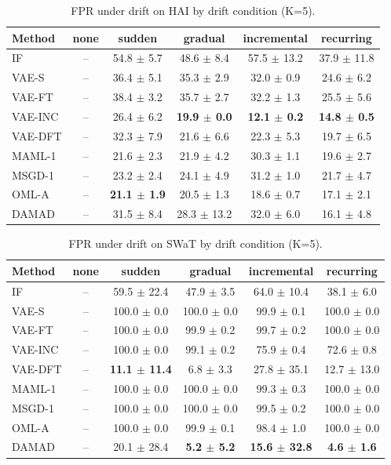 \begin{table}[t]
\centering
\small
\caption{FPR under drift on HAI by drift condition (K=5).}
\label{tab:drift_fpr_drift_hai}
\begin{tabular}{lccccc}
\toprule
Method & none & sudden & gradual & incremental & recurring \\
\midrule
IF & – & 54.8 $\pm$ 5.7 & 48.6 $\pm$ 8.4 & 57.5 $\pm$ 13.2 & 37.9 $\pm$ 11.8 \\
VAE-S & – & 36.4 $\pm$ 5.1 & 35.3 $\pm$ 2.9 & 32.0 $\pm$ 0.9 & 24.6 $\pm$ 6.2 \\
VAE-FT & – & 38.4 $\pm$ 3.2 & 35.7 $\pm$ 2.7 & 32.2 $\pm$ 1.3 & 25.5 $\pm$ 5.6 \\
VAE-INC & – & 26.4 $\pm$ 6.2 & \textbf{19.9 $\pm$ 0.0} & \textbf{12.1 $\pm$ 0.2} & \textbf{14.8 $\pm$ 0.5} \\
VAE-DFT & – & 32.3 $\pm$ 7.9 & 21.6 $\pm$ 6.6 & 22.3 $\pm$ 5.3 & 19.7 $\pm$ 6.5 \\
MAML-1 & – & 21.6 $\pm$ 2.3 & 21.9 $\pm$ 4.2 & 30.3 $\pm$ 1.1 & 19.6 $\pm$ 2.7 \\
MSGD-1 & – & 23.2 $\pm$ 2.4 & 24.1 $\pm$ 4.9 & 31.2 $\pm$ 1.0 & 21.7 $\pm$ 4.7 \\
OML-A & – & \textbf{21.1 $\pm$ 1.9} & 20.5 $\pm$ 1.3 & 18.6 $\pm$ 0.7 & 17.1 $\pm$ 2.1 \\
DAMAD & – & 31.5 $\pm$ 8.4 & 28.3 $\pm$ 13.2 & 32.0 $\pm$ 6.0 & 16.1 $\pm$ 4.8 \\
\bottomrule
\end{tabular}
\end{table}

\begin{table}[t]
\centering
\small
\caption{FPR under drift on SWaT by drift condition (K=5).}
\label{tab:drift_fpr_drift_swat}
\begin{tabular}{lccccc}
\toprule
Method & none & sudden & gradual & incremental & recurring \\
\midrule
IF & – & 59.5 $\pm$ 22.4 & 47.9 $\pm$ 3.5 & 64.0 $\pm$ 10.4 & 38.1 $\pm$ 6.0 \\
VAE-S & – & 100.0 $\pm$ 0.0 & 100.0 $\pm$ 0.0 & 99.9 $\pm$ 0.1 & 100.0 $\pm$ 0.0 \\
VAE-FT & – & 100.0 $\pm$ 0.0 & 99.9 $\pm$ 0.2 & 99.7 $\pm$ 0.2 & 100.0 $\pm$ 0.0 \\
VAE-INC & – & 100.0 $\pm$ 0.0 & 99.1 $\pm$ 0.2 & 75.9 $\pm$ 0.4 & 72.6 $\pm$ 0.8 \\
VAE-DFT & – & \textbf{11.1 $\pm$ 11.4} & 6.8 $\pm$ 3.3 & 27.8 $\pm$ 35.1 & 12.7 $\pm$ 13.0 \\
MAML-1 & – & 100.0 $\pm$ 0.0 & 100.0 $\pm$ 0.0 & 99.3 $\pm$ 0.3 & 100.0 $\pm$ 0.0 \\
MSGD-1 & – & 100.0 $\pm$ 0.0 & 100.0 $\pm$ 0.0 & 99.5 $\pm$ 0.2 & 100.0 $\pm$ 0.0 \\
OML-A & – & 100.0 $\pm$ 0.0 & 99.9 $\pm$ 0.1 & 98.4 $\pm$ 1.0 & 100.0 $\pm$ 0.0 \\
DAMAD & – & 20.1 $\pm$ 28.4 & \textbf{5.2 $\pm$ 5.2} & \textbf{15.6 $\pm$ 32.8} & \textbf{4.6 $\pm$ 1.6} \\
\bottomrule
\end{tabular}
\end{table}

